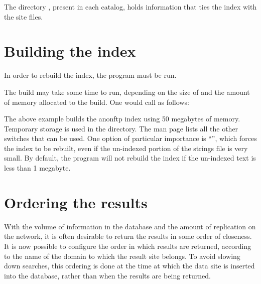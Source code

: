 The directory , present in each catalog, holds information
that ties the index with the site files.

\section{Building the index}


In order to rebuild the index, the program  must be run.

The build may take some time to run, depending on the size of
 and the amount of memory allocated to the build.
One would call  as follows:


The above example builds the anonftp index using 50 megabytes of memory.
Temporary storage is used in the  directory. The man page lists
all the other switches that can be used. One option of particular importance
is ``'', which forces the index to be rebuilt, even if the un-indexed
portion of the strings file is very small. By default, the program will not
rebuild the index if the un-indexed text is less than 1 megabyte.




\section{Ordering the results}

With the volume of information in the database and the amount of replication
on the network, it is often desirable to return the results in some order of
closeness. It is now possible to configure the order in which results are
returned, according to the name of the domain to which the result site
belongs. To avoid slowing down searches, this ordering is done at the time at
which the data site is inserted into the database, rather than when the
results are being returned.

